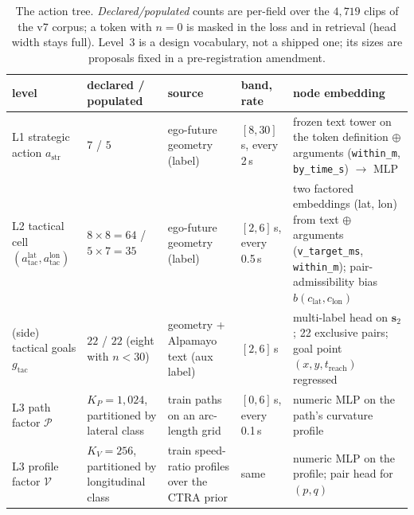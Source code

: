 \begin{table}[t]
\centering\small
\caption{The action tree. \emph{Declared/populated} counts are per-field over the $4{,}719$ clips of the v7 corpus\evI; a token with $n=0$ is masked in the loss and in retrieval
(head width stays full). Level~3 is a design vocabulary, not a shipped one; its sizes are proposals fixed in a pre-registration amendment.}
\label{tab:vocab}
\begin{tabularx}{\textwidth}{@{}p{2.2cm}p{2.3cm}p{2.5cm}p{2.0cm}X@{}}
\toprule
level & declared / populated & source & band, rate & node embedding \\ \midrule
L1 strategic action $a_{\text{str}}$ & $7$ / $5$ & ego-future geometry (label) & $[8,30]$\,s, every 2\,s & frozen text tower on the token definition $\oplus$ arguments (\texttt{within\_m}, \texttt{by\_time\_s}) $\to$ MLP \\
L2 tactical cell $(a_{\text{tac}}^{\text{lat}},a_{\text{tac}}^{\text{lon}})$ & $8\times8=64$ / $5\times7=35$ & ego-future geometry (label) & $[2,6]$\,s, every 0.5\,s & two factored embeddings (lat, lon) from text $\oplus$ arguments (\texttt{v\_target\_ms}, \texttt{within\_m}); pair-admissibility bias $b(c_{\text{lat}},c_{\text{lon}})$ \\
(side) tactical goals $g_{\text{tac}}$ & $22$ / $22$ (eight with $n<30$) & geometry + Alpamayo text (aux label) & $[2,6]$\,s & multi-label head on $\mathbf s_2$; 22 exclusive pairs; goal point $(x,y,t_{\text{reach}})$ regressed \\
L3 path factor $\mathcal P$ & $K_P=1{,}024$, partitioned by lateral class & train paths on an arc-length grid & $[0,6]$\,s, every 0.1\,s & numeric MLP on the path's curvature profile \\
L3 profile factor $\mathcal V$ & $K_V=256$, partitioned by longitudinal class & train speed-ratio profiles over the CTRA prior & same & numeric MLP on the profile; pair head for $(p,q)$ \\
\bottomrule
\end{tabularx}
\end{table}

